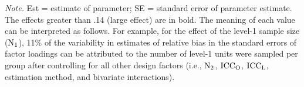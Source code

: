 \documentclass[man, noextraspace, 12pt]{apa7}
\begin{document}
\begin{table}[h]
\begin{threeparttable}
\begin{tabular}{l *{8}{r}}
  \bottomrule
 \end{tabular}
 \vspace*{1mm}
 	\begin{tablenotes}
    {\small
        \textit{Note.} Est = estimate of parameter; SE = standard error of parameter estimate. The effects greater than .14 (large effect) are in bold. The meaning of each value can be interpreted as follows. For example, for the effect of the level-1 sample size ($\rm N_1$), 11\% of the variability in estimates of relative bias in the standard errors of factor loadings can be attributed to the number of level-1 units were sampled per group after controlling for all other design factors (i.e., $\rm N_2$, $\rm ICC_O$, $\rm ICC_L$, estimation method, and bivariate interactions).
    }
 	\end{tablenotes}
 \end{threeparttable}
\end{table}
%
\end{document}

